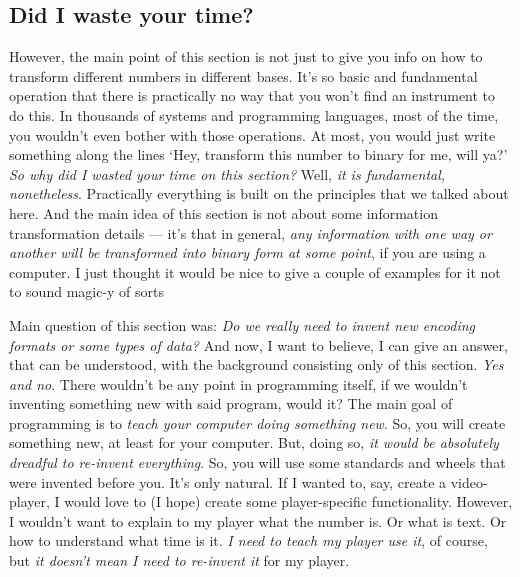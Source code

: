 \documentclass{report}
\begin{document}
            \subsection{Did I waste your time?}
            
            However, the main point of this section is not just to give you info on how to transform different numbers in different bases. It's so basic and fundamental
            operation that there is practically no way that you won't find an instrument to do this. In thousands of systems and programming languages, most of the time,
            you wouldn't even bother with those operations. At most, you would just write something along the lines `Hey, transform this number to binary for me, will ya?'
            \emph{So why did I wasted your time on this section?} Well, \emph{it is fundamental, nonetheless}. Practically everything is built on the principles that we 
            talked about here. And the main idea of this section is not about some information transformation details --- it's that in general, \emph{any information
            with one way or another will be transformed into binary form at some point}, if you are using a computer. I just thought it would be nice to give a couple of examples for
            it not to sound magic-y of sorts \par

            Main question of this section was: \emph{Do we really need to invent new encoding formats or some types of data?} And now, I want to believe, I can give an answer, that
            can be understood, with the background consisting only of this section. \emph{Yes and no}. There wouldn't be any point in programming itself, if we wouldn't 
            inventing something new with said program, would it? The main goal of programming is to \emph{teach your computer doing something new}. So, you will create 
            something new, at least for your computer. But, doing so, \emph{it would be absolutely dreadful to re-invent everything}. So, you will use some standards and
            wheels that were invented before you. It's only natural. If I wanted to, say, create a video-player, I would love to (I hope) create some player-specific functionality.
            However, I wouldn't want to explain to my player what the number is. Or what is text. Or how to understand what time is it. \emph{I need to teach my player use it}, of course,
            but \emph{it doesn't mean I need to re-invent it} for my player. \par
\end{document}
